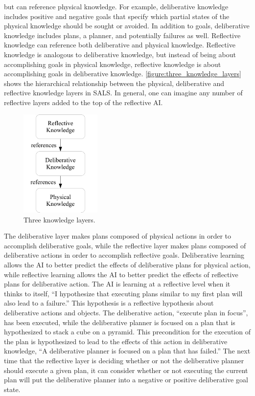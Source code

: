 but can reference physical knowledge.  For example, deliberative
knowledge includes positive and negative goals that specify which
partial states of the physical knowledge should be sought or avoided.
In addition to goals, deliberative knowledge includes plans, a
planner, and potentially failures as well.  Reflective knowledge can
reference both deliberative and physical knowledge.  Reflective
knowledge is analogous to deliberative knowledge, but instead of being
about accomplishing goals in physical knowledge, reflective knowledge
is about accomplishing goals in deliberative knowledge.
{\autoref{figure:three_knowledge_layers}} shows the hierarchical
relationship between the physical, deliberative and reflective
knowledge layers in SALS.  In general, one can imagine any number of
reflective layers added to the top of the reflective AI.
\begin{figure}
  \center
  \includegraphics[width=4cm]{gfx/three_knowledge_layers}
  \caption{Three knowledge layers.}
  \label{figure:three_knowledge_layers}
\end{figure}

The deliberative layer makes plans composed of physical actions in
order to accomplish deliberative goals, while the reflective layer
makes plans composed of deliberative actions in order to accomplish
reflective goals.  Deliberative learning allows the AI to better
predict the effects of deliberative plans for physical action, while
reflective learning allows the AI to better predict the effects of
reflective plans for deliberative action.  The AI is learning at a
reflective level when it thinks to itself, ``I hypothesize that
executing plans similar to my first plan will also lead to a
failure.''  This hypothesis is a reflective hypothesis about
deliberative actions and objects.  The deliberative action, ``execute
plan in focus'', has been executed, while the deliberative planner is
focused on a plan that is hypothesized to stack a cube on a pyramid.
This precondition for the execution of the plan is hypothesized to
lead to the effects of this action in deliberative knowledge, ``A
deliberative planner is focused on a plan that has failed.''  The next
time that the reflective layer is deciding whether or not the
deliberative planner should execute a given plan, it can consider
whether or not executing the current plan will put the deliberative
planner into a negative or positive deliberative goal state.

